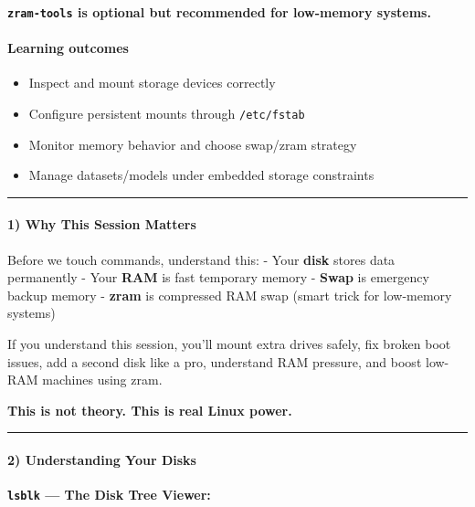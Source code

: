 \documentclass[
  english,
  paper=a4,
  oneside  ,captions=tableheading
]{scrartcl}
\providecommand{\tightlist}{%
  \setlength{\itemsep}{0pt}\setlength{\parskip}{0pt}}
\renewenvironment{quote}{\begin{customblockquote}\list{}{\rightmargin=0em\leftmargin=0em}%
\item\relax\color{blockquote-text}\ignorespaces}{\unskip\unskip\endlist\end{customblockquote}}
\begin{document}
\begin{quote}
\textbf{\texttt{zram-tools} is optional but recommended for low-memory
systems.}
\end{quote}

\paragraph{Learning outcomes}\label{learning-outcomes-8}

\begin{itemize}
\tightlist
\item
  Inspect and mount storage devices correctly
\item
  Configure persistent mounts through \texttt{/etc/fstab}
\item
  Monitor memory behavior and choose swap/zram strategy
\item
  Manage datasets/models under embedded storage constraints
\end{itemize}

\begin{center}\rule{0.5\linewidth}{0.5pt}\end{center}

\paragraph{1) Why This Session Matters}\label{why-this-session-matters}

Before we touch commands, understand this: - Your \textbf{disk} stores
data permanently - Your \textbf{RAM} is fast temporary memory -
\textbf{Swap} is emergency backup memory - \textbf{zram} is compressed
RAM swap (smart trick for low-memory systems)

If you understand this session, you'll mount extra drives safely, fix
broken boot issues, add a second disk like a pro, understand RAM
pressure, and boost low-RAM machines using zram.

\textbf{This is not theory. This is real Linux power.}

\begin{center}\rule{0.5\linewidth}{0.5pt}\end{center}

\paragraph{2) Understanding Your Disks}\label{understanding-your-disks}

\textbf{\texttt{lsblk} --- The Disk Tree Viewer:}
\end{document}
